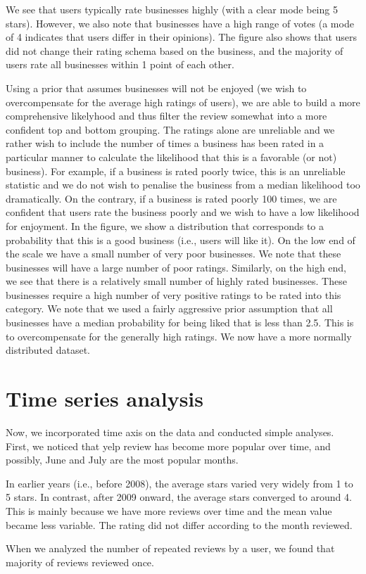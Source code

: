 \documentclass[11pt]{article}
\begin{document}
\par We see that users typically rate businesses highly (with a clear mode being 5 stars). However, we also note that businesses have a high range of votes (a mode of 4 indicates that users differ in their opinions). The figure also shows that users did not change their rating schema based on the business, and the majority of users rate all businesses within 1 point of each other. 

\par Using a prior that assumes businesses will not be enjoyed (we wish to overcompensate for the average high ratings of users), we are able to build a more comprehensive likelyhood and thus filter the review somewhat into a more confident top and bottom grouping. The ratings alone are unreliable and we rather wish to include the number of times a business has been rated in a particular manner to calculate the likelihood that this is a favorable (or not) business). For example, if a business is rated poorly twice, this is an unreliable statistic and we do not wish to penalise the business from a median likelihood too dramatically. On the contrary, if a business is rated poorly 100 times, we are confident that users rate the business poorly and we wish to have a low likelihood for enjoyment. In the figure, we show a distribution that corresponds to a probability that this is a good business (i.e., users will like it). On the low end of the scale we have a small number of very poor businesses. We note that these businesses will have a large number of poor ratings. Similarly, on the high end, we see that there is a relatively small number of highly rated businesses. These businesses require a high number of very positive ratings to be rated into this category. We note that we used a fairly aggressive prior assumption that all businesses have a median probability for being liked that is less than 2.5. This is to overcompensate for the generally high ratings. We now have a more normally distributed dataset.

\section*{Time series analysis}
Now, we incorporated time axis on the data and conducted simple analyses. First, we noticed that yelp review has become more popular over time, and possibly, June and July are the most popular months.

\par In earlier years (i.e., before 2008), the average stars varied very widely from 1 to 5 stars. In contrast, after 2009 onward, the average stars converged to around 4. This is mainly because we have more reviews over time and the mean value became less variable. The rating did not differ according to the month reviewed.

\par When we analyzed the number of repeated reviews by a user, we found that majority of reviews reviewed once.
\end{document}
